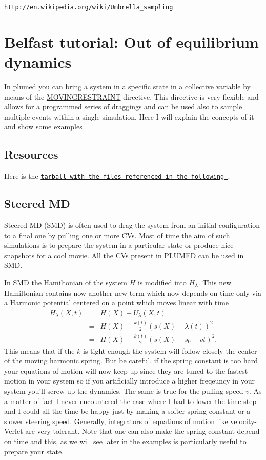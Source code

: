 \begin{DoxyItemize}
\item \href{http://en.wikipedia.org/wiki/Umbrella_sampling}{\tt http\+://en.\+wikipedia.\+org/wiki/\+Umbrella\+\_\+sampling} 
\end{DoxyItemize}\hypertarget{belfast-5}{}\section{Belfast tutorial\+: Out of equilibrium dynamics}\label{belfast-5}
In plumed you can bring a system in a specific state in a collective variable by means of the \hyperlink{MOVINGRESTRAINT}{M\+O\+V\+I\+N\+G\+R\+E\+S\+T\+R\+A\+I\+N\+T} directive. This directive is very flexible and allows for a programmed series of draggings and can be used also to sample multiple events within a single simulation. Here I will explain the concepts of it and show some examples\hypertarget{belfast-10_Resources}{}\subsection{Resources}\label{belfast-10_Resources}
Here is the \href{tutorial-resources/belfast-5.tar.gz}{\tt tarball with the files referenced in the following }.\hypertarget{belfast-5_belfast-5-SMD}{}\subsection{Steered M\+D}\label{belfast-5_belfast-5-SMD}
Steered M\+D (S\+M\+D) is often used to drag the system from an initial configuration to a final one by pulling one or more C\+Vs. Most of time the aim of such simulations is to prepare the system in a particular state or produce nice snapshots for a cool movie. All the C\+Vs present in P\+L\+U\+M\+E\+D can be used in S\+M\+D.

In S\+M\+D the Hamiltonian of the system $ H $ is modified into $H_\lambda$. This new Hamiltonian contains now another new term which now depends on time only via a Harmonic potential centered on a point which moves linear with time \begin{eqnarray*} H_\lambda(X,t)&=&H(X)+U_\lambda(X,t)\\ &=&H(X)+\frac{k(t)}{2}(s(X)-\lambda(t))^2\\ &=&H(X)+\frac{k(t)}{2}(s(X)-s_0-vt)^2. \end{eqnarray*} This means that if the $ k $ is tight enough the system will follow closely the center of the moving harmonic spring. But be careful, if the spring constant is too hard your equations of motion will now keep up since they are tuned to the fastest motion in your system so if you artificially introduce a higher freqeuncy in your system you'll screw up the dynamics. The same is true for the pulling speed $ v $. As a matter of fact I never encountered the case where I had to lower the time step and I could all the time be happy just by making a softer spring constant or a slower steering speed. Generally, integrators of equations of motion like velocity-\/\+Verlet are very tolerant. Note that one can also make the spring constant depend on time and this, as we will see later in the examples is particularly useful to prepare your state.

